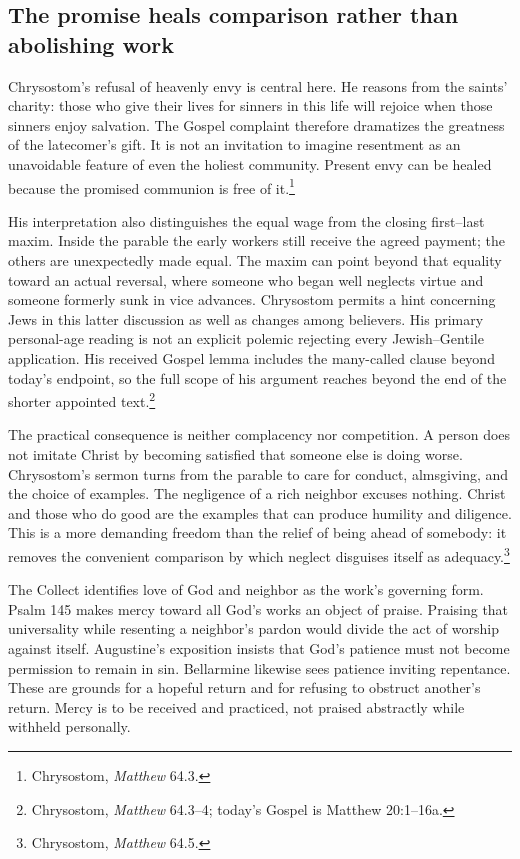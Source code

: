 \subsection{The promise heals comparison rather than abolishing work}
Chrysostom's refusal of heavenly envy is central here. He reasons from the saints' charity: those who give their lives for sinners in this life will rejoice when those sinners enjoy salvation. The Gospel complaint therefore dramatizes the greatness of the latecomer's gift. It is not an invitation to imagine resentment as an unavoidable feature of even the holiest community. Present envy can be healed because the promised communion is free of it.\footnote{Chrysostom, \textit{Matthew} 64.3.}

His interpretation also distinguishes the equal wage from the closing first--last maxim. Inside the parable the early workers still receive the agreed payment; the others are unexpectedly made equal. The maxim can point beyond that equality toward an actual reversal, where someone who began well neglects virtue and someone formerly sunk in vice advances. Chrysostom permits a hint concerning Jews in this latter discussion as well as changes among believers. His primary personal-age reading is not an explicit polemic rejecting every Jewish--Gentile application. His received Gospel lemma includes the many-called clause beyond today's endpoint, so the full scope of his argument reaches beyond the end of the shorter appointed text.\footnote{Chrysostom, \textit{Matthew} 64.3--4; today's Gospel is Matthew 20:1--16a.}

The practical consequence is neither complacency nor competition. A person does not imitate Christ by becoming satisfied that someone else is doing worse. Chrysostom's sermon turns from the parable to care for conduct, almsgiving, and the choice of examples. The negligence of a rich neighbor excuses nothing. Christ and those who do good are the examples that can produce humility and diligence. This is a more demanding freedom than the relief of being ahead of somebody: it removes the convenient comparison by which neglect disguises itself as adequacy.\footnote{Chrysostom, \textit{Matthew} 64.5.}

The Collect identifies love of God and neighbor as the work's governing form. Psalm 145 makes mercy toward all God's works an object of praise. Praising that universality while resenting a neighbor's pardon would divide the act of worship against itself. Augustine's exposition insists that God's patience must not become permission to remain in sin. Bellarmine likewise sees patience inviting repentance. These are grounds for a hopeful return and for refusing to obstruct another's return. Mercy is to be received and practiced, not praised abstractly while withheld personally.

